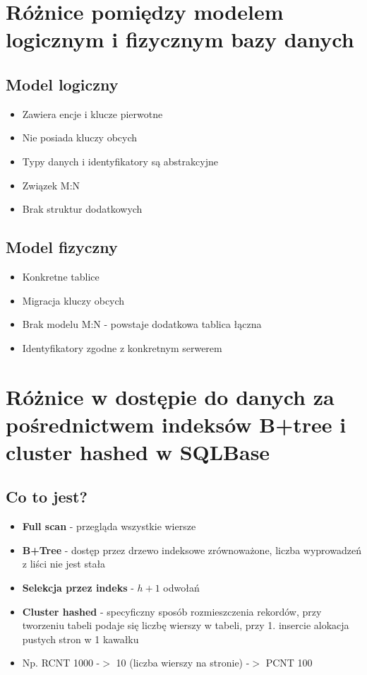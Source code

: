 \documentclass[a4paper,twoside]{article}
\begin{document}
  	\section*{Różnice pomiędzy modelem logicznym i fizycznym bazy danych}
  	\subsection*{Model logiczny}	%
  	\begin{itemize}
  		\item Zawiera encje i klucze pierwotne
  		\item Nie posiada kluczy obcych
  		\item Typy danych i identyfikatory są abstrakcyjne
  		\item Związek M:N
  		\item Brak struktur dodatkowych
  	\end{itemize}
  	\subsection*{Model fizyczny}	%
  	\begin{itemize}
  		\item Konkretne tablice
  		\item Migracja kluczy obcych
  		\item Brak modelu M:N - powstaje dodatkowa tablica łączna
  		\item Identyfikatory zgodne z konkretnym serwerem
  	\end{itemize}
  	
  	\section*{Różnice w dostępie do danych za pośrednictwem indeksów B+tree i cluster hashed w SQLBase}
  	\subsection*{Co to jest?}
  	\begin{itemize}
  		\item \textbf{Full scan} - przegląda wszystkie wiersze
  		\item \textbf{B+Tree} - dostęp przez drzewo indeksowe zrównoważone, liczba wyprowadzeń z liści nie jest stała
  		\item \textbf{Selekcja przez indeks} - ${h+1}$ odwołań
  		\item \textbf{Cluster hashed} - specyficzny sposób rozmieszczenia rekordów, przy tworzeniu tabeli podaje się liczbę wierszy w tabeli, przy 1.  insercie alokacja pustych stron w 1 kawałku
  		\item Np. RCNT 1000 -$ > $ 10 (liczba wierszy na stronie) -$ > $ PCNT 100
  	\end{itemize}
\end{document}
